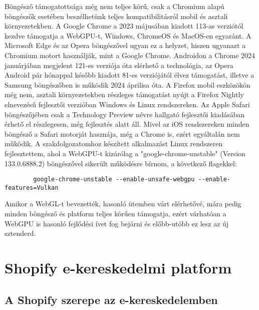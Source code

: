 \documentclass[12pt]{report}
\begin{document}
        Böngésző támogatottsága még nem teljes körű, csak a Chromium alapú böngészők esetében beszélhetünk teljes kompatibilitásról mobil és asztali környezetekben. A Google Chrome a 2023 májusában kiadott 113-as verziótól kezdve támogatja a WebGPU-t, Windows, ChromeOS és MacOS-en egyaránt. A Microsoft Edge és az Opera böngészővel ugyan ez a helyzet, hiszen ugyanazt a Chromium motort használják, mint a Google Chrome. 
        Androidon a Chrome 2024 januárjában megjelent 121-es verziója óta elérhető a technológia, az Opera Android pár hónappal később kiadott 81-es verziójától élvez támogatást, illetve a Samsung böngészőben is működik 2024 áprilisa óta.
        A Firefox mobil eszközökön még nem, asztali környezetekben részleges támogatást nyújt a Firefox Nightly elnevezésű fejlesztői verzióban Windows és Linux rendszereken. 
        Az Apple Safari böngészőjében csak a Technology Preview névre hallgató fejlesztői kiadásában érhető el részlegesen, még fejlesztés alatt áll. Mivel az iOS rendszereken minden böngésző a Safari motorját hasznája, még a Chrome is, ezért egyáltalán nem működik. 
        A szakdolgozatomhoz készített alkalmazást Linux rendszeren fejlesztettem, ahol a WebGPU-t kizárólag a "google-chrome-unstable" (Version 133.0.6888.2) böngészővel sikerült működésre bírnom, a következő flagekkel:
        \begin{verbatim}
        google-chrome-unstable --enable-unsafe-webgpu --enable-features=Vulkan
        \end{verbatim}
        Amikor a WebGL-t bevezették, hasonló ütemben várt elérhetővé, mára pedig minden böngésző és platform teljes körűen támogatja, ezért várhatóan a WebGPU is hasonló fejlődési ívet fog bejárni és előbb-utóbb ez lesz az új sztenderd.
        
        \chapter{Shopify e-kereskedelmi platform}\label{ch:shopify}
        \section{A Shopify szerepe az e-kereskedelemben}
\end{document}
